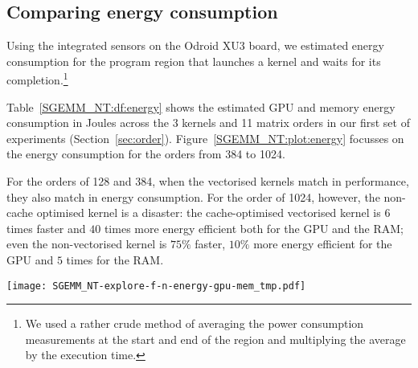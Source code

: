 \documentclass{acm_proc_article-sp} %
\begin{document}
\begin{table*}
  \centering
  \caption{\label{SGEMM_NT:df:lws}The performance of {\tt SGEMM\_NT\_4x1\_barrier.cl} across local work sizes: {\tt pandas} DataFrame with raw results.}
  
\end{table*}

\subsection{Comparing energy consumption}

Using the integrated sensors on the Odroid XU3 board, we estimated energy
consumption for the program region that launches a kernel and waits for its
completion.\footnote{We used a rather crude method of averaging the power
consumption measurements at the start and end of the region and multiplying the
average by the execution time.}

Table~\ref{SGEMM_NT:df:energy} shows the estimated GPU and memory energy
consumption in Joules across the 3 kernels and 11 matrix orders in our first
set of experiments (Section~\ref{sec:order}).
%
Figure~\ref{SGEMM_NT:plot:energy} focusses on the energy consumption for the
orders from 384 to 1024.

For the orders of 128 and 384, when the vectorised kernels match in
performance, they also match in energy consumption.
%
For the order of 1024, however, the non-cache optimised kernel is a disaster:
%
the cache-optimised vectorised kernel is $6$ times faster and $40$ times more
energy efficient both for the GPU and the RAM;
%
even the non-vectorised kernel is $75\%$ faster, $10\%$ more energy efficient
for the GPU and $5$ times for the RAM.

\begin{table*}
  \centering
  \caption{\label{SGEMM_NT:df:energy}The GPU \& memory energy consumption of 3 SGEMM NT kernels: {\tt pandas} DataFrame with raw results.}
  
\end{table*}

\begin{figure*}
  \texttt{[image: SGEMM\_NT-explore-f-n-energy-gpu-mem\_tmp.pdf]}
  \caption{The GPU \& memory energy consumption of 3 SGEMM NT kernels: {\tt matplotlib} bar plot.}
  \label{SGEMM_NT:plot:energy}
\end{figure*}
\end{document}
